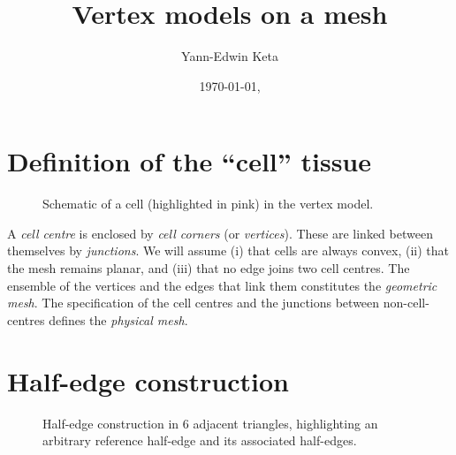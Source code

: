 \documentclass[aps, superscriptaddress, notitlepage, longbibliography]{revtex4-1}
\begin{document}

\title{Vertex models on a mesh}
\author{Yann-Edwin Keta}
\date{\today, \currenttime}
\maketitle


\section{Definition of the ``cell'' tissue}

\begin{figure}[H]
\centering
\begin{tikzpicture}[scale=0.75*\scale]

\end{tikzpicture}
\caption{Schematic of a cell (highlighted in pink) in the vertex model.}
\label{fig:schematic}
\end{figure}

A \textit{cell centre} is enclosed by \textit{cell corners} (or \textit{vertices}). These are linked between themselves by \textit{junctions}. We will assume (i) that cells are always convex, (ii) that the mesh remains planar, and (iii) that no edge joins two cell centres. The ensemble of the vertices and the edges that link them constitutes the \textit{geometric mesh}. The specification of the cell centres and the junctions between non-cell-centres defines the \textit{physical mesh}.

\section{Half-edge construction}

\begin{figure}[!b]
\centering
\begin{tikzpicture}[scale=0.8*\scale]

\end{tikzpicture}
\caption{Half-edge construction in 6 adjacent triangles, highlighting an arbitrary reference half-edge and its associated half-edges.}
\label{fig:he}
\end{figure}
\end{document}
